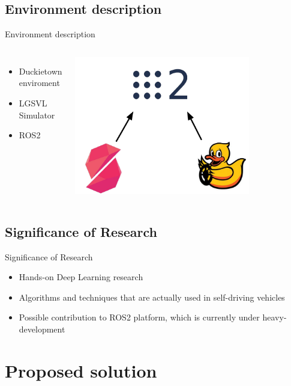 \documentclass{beamer}
\begin{document}
\subsection{Environment description}
\begin{frame}{Environment description}
\begin{columns}
\begin{itemize}
    \item Duckietown enviroment
    \item LGSVL Simulator
    \item ROS2
\end{itemize}

    \includegraphics[width=0.75\textwidth]{fig/SS_AI.pdf}
\end{columns}

\end{frame}

\subsection{Significance of Research }
\begin{frame}{Significance of Research }
    \begin{itemize}
        \item Hands-on Deep Learning research
        \item Algorithms and techniques that are actually used in self-driving vehicles
        \item Possible contribution to ROS2 platform, which is currently under heavy-development
    \end{itemize}
\end{frame}

\section{Proposed solution}
\end{document}
